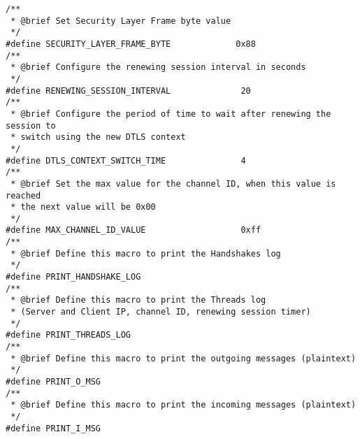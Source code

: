 %
%
%
%
%
\begin{lstlisting}[caption={Security layer configuration file},label={config_file}]
/**
 * @brief Set Security Layer Frame byte value
 */
#define SECURITY_LAYER_FRAME_BYTE             0x88
/**
 * @brief Configure the renewing session interval in seconds
 */
#define RENEWING_SESSION_INTERVAL              20
/**
 * @brief Configure the period of time to wait after renewing the session to
 * switch using the new DTLS context
 */
#define DTLS_CONTEXT_SWITCH_TIME               4
/**
 * @brief Set the max value for the channel ID, when this value is reached
 * the next value will be 0x00
 */
#define MAX_CHANNEL_ID_VALUE                   0xff
/**
 * @brief Define this macro to print the Handshakes log
 */
#define PRINT_HANDSHAKE_LOG
/**
 * @brief Define this macro to print the Threads log
 * (Server and Client IP, channel ID, renewing session timer)
 */
#define PRINT_THREADS_LOG
/**
 * @brief Define this macro to print the outgoing messages (plaintext)
 */
#define PRINT_O_MSG
/**
 * @brief Define this macro to print the incoming messages (plaintext)
 */
#define PRINT_I_MSG
\end{lstlisting}
